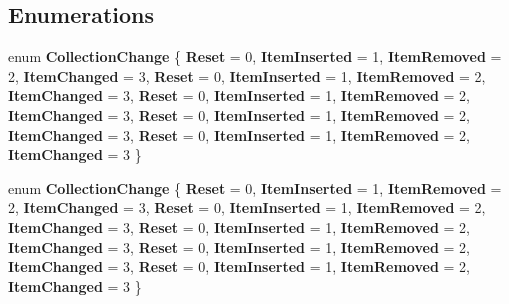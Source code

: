 \subsection*{Enumerations}
\begin{DoxyCompactItemize}
\item 
\mbox{\label{namespace_windows_1_1_foundation_1_1_collections_a7bfda33cd0406e655136bb5f3c756232}} 
enum {\bfseries Collection\+Change} \{ \newline
{\bfseries Reset} = 0, 
{\bfseries Item\+Inserted} = 1, 
{\bfseries Item\+Removed} = 2, 
{\bfseries Item\+Changed} = 3, 
\newline
{\bfseries Reset} = 0, 
{\bfseries Item\+Inserted} = 1, 
{\bfseries Item\+Removed} = 2, 
{\bfseries Item\+Changed} = 3, 
\newline
{\bfseries Reset} = 0, 
{\bfseries Item\+Inserted} = 1, 
{\bfseries Item\+Removed} = 2, 
{\bfseries Item\+Changed} = 3, 
\newline
{\bfseries Reset} = 0, 
{\bfseries Item\+Inserted} = 1, 
{\bfseries Item\+Removed} = 2, 
{\bfseries Item\+Changed} = 3, 
\newline
{\bfseries Reset} = 0, 
{\bfseries Item\+Inserted} = 1, 
{\bfseries Item\+Removed} = 2, 
{\bfseries Item\+Changed} = 3
 \}
\item 
\mbox{\label{namespace_windows_1_1_foundation_1_1_collections_a7bfda33cd0406e655136bb5f3c756232}} 
enum {\bfseries Collection\+Change} \{ \newline
{\bfseries Reset} = 0, 
{\bfseries Item\+Inserted} = 1, 
{\bfseries Item\+Removed} = 2, 
{\bfseries Item\+Changed} = 3, 
\newline
{\bfseries Reset} = 0, 
{\bfseries Item\+Inserted} = 1, 
{\bfseries Item\+Removed} = 2, 
{\bfseries Item\+Changed} = 3, 
\newline
{\bfseries Reset} = 0, 
{\bfseries Item\+Inserted} = 1, 
{\bfseries Item\+Removed} = 2, 
{\bfseries Item\+Changed} = 3, 
\newline
{\bfseries Reset} = 0, 
{\bfseries Item\+Inserted} = 1, 
{\bfseries Item\+Removed} = 2, 
{\bfseries Item\+Changed} = 3, 
\newline
{\bfseries Reset} = 0, 
{\bfseries Item\+Inserted} = 1, 
{\bfseries Item\+Removed} = 2, 
{\bfseries Item\+Changed} = 3
 \}
\item 
\mbox{\label{namespace_windows_1_1_foundation_1_1_collections_a7bfda33cd0406e655136bb5f3c756232}} 

\end{DoxyCompactItemize}
